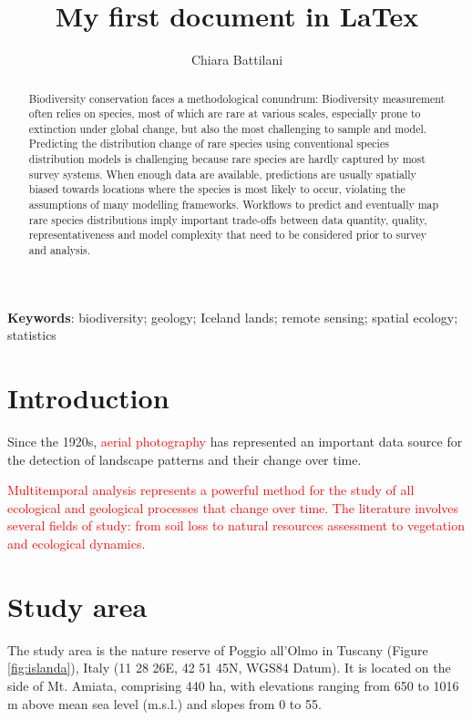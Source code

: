 \documentclass[a4paper, 12pt]{article} %
\title{My first document in LaTex} %
\author{Chiara Battilani}
\newcommand{\tr}{\textcolor{red}}
\begin{document}
\maketitle %
\tableofcontents %

\begin{abstract}
Biodiversity conservation faces a methodological conundrum: Biodiversity measurement often relies on species, most of which are rare at various scales, especially prone
to extinction under global change, but also the most challenging to sample and model.
Predicting the distribution change of rare species using conventional species distribution models is challenging because rare species are hardly captured by most survey
systems. When enough data are available, predictions are usually spatially biased towards locations where the species is most likely to occur, violating the assumptions of
many modelling frameworks. Workflows to predict and eventually map rare species
distributions imply important trade-­offs between data quantity, quality, representativeness and model complexity that need to be considered prior to survey and analysis.
\end{abstract}

\noindent \textbf{Keywords}: biodiversity; geology; Iceland lands; remote sensing; spatial ecology; statistics %

\section{Introduction}\label{sec:intro}

Since the 1920s, \textcolor{red}{aerial photography} has represented an important data source for the detection of landscape patterns and their change over time.

\tr{Multitemporal analysis represents a powerful method for the study of all ecological and geological processes that change over time. The literature involves several fields of study: from soil loss to natural resources assessment to vegetation and ecological dynamics.}


\section{Study area}
The study area is the nature reserve of Poggio all’Olmo in Tuscany (Figure  \ref{fig:islanda}), Italy (11 28 26E, 42 51 45N, WGS84 Datum). It is located on the side of Mt. Amiata,
comprising 440 ha, with elevations ranging from 650 to 1016 m above mean sea level (m.s.l.) and slopes from 0 to 55.
\end{document}

